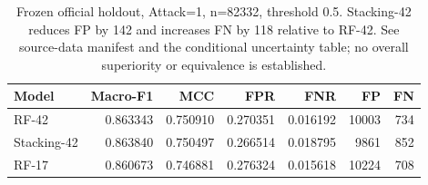 \begin{table}[htbp]
\centering
\small
\begin{tabular}{lrrrrrr}
\hline
Model & Macro-F1 & MCC & FPR & FNR & FP & FN \\
\hline
RF-42 & 0.863343 & 0.750910 & 0.270351 & 0.016192 & 10003 & 734 \\
Stacking-42 & 0.863840 & 0.750497 & 0.266514 & 0.018795 & 9861 & 852 \\
RF-17 & 0.860673 & 0.746881 & 0.276324 & 0.015618 & 10224 & 708 \\
\hline
\end{tabular}
\caption{Frozen official holdout, Attack=1, n=82332, threshold 0.5. Stacking-42 reduces FP by 142 and increases FN by 118 relative to RF-42. See source-data manifest and the conditional uncertainty table; no overall superiority or equivalence is established.}
\label{tab:r05-official-performance}
\end{table}
